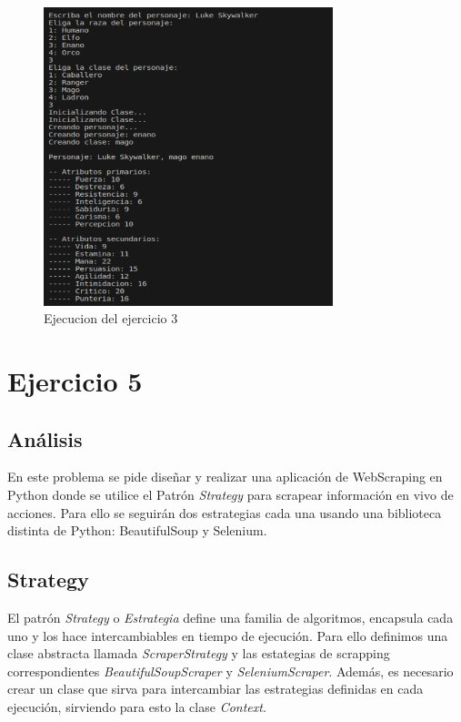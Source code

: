 \documentclass{article}
\begin{document}
\begin{figure}[h]
	\centering
        \vspace{15pt}
	\includegraphics[width=0.75\textwidth]{DS_ejecucion_ej3.png}
	\caption{Ejecucion del ejercicio 3}
	\label{fig:ejecucion_ej3}
\end{figure}



\newpage
\section{Ejercicio 5}
\subsection{Análisis}
En este problema se pide diseñar y realizar una aplicación de WebScraping en Python donde se utilice el Patrón \textit{Strategy} para scrapear
información en vivo de acciones.  Para ello se seguirán dos estrategias cada una usando una biblioteca distinta de Python: BeautifulSoup y Selenium.

\subsection{Strategy}
El patrón \textit{Strategy} o \textit{Estrategia} define una familia de algoritmos, encapsula cada uno y los hace intercambiables en tiempo de
ejecución. Para ello definimos una clase abstracta llamada \textit{ScraperStrategy} y las estategias de scrapping correspondientes
\textit{BeautifulSoupScraper} y \textit{SeleniumScraper}. Además, es necesario crear un clase que sirva para intercambiar las estrategias
definidas en cada ejecución, sirviendo para esto la clase \textit{Context}.
\end{document}
